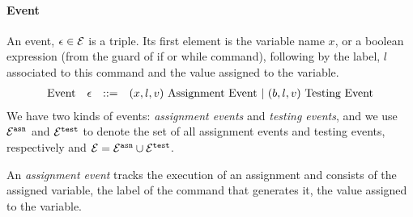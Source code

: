 

\paragraph{Event}
An event, $\mathtt{\epsilon} \in \mathcal{E}$ is a triple.
Its first element is the variable name $x$,
or a boolean expression (from the guard of if or while command), 
following by 
 the label, $l$ associated to this command and the value assigned to the variable.
 \[
  \begin{array}{llll}
    \mbox{Event} 
    & \mathtt{\epsilon} & ::= & 
    ({x}, l, v) ~ \mbox{Assignment Event} 
    ~|~(b, l, v) ~ \mbox{Testing Event}
  \end{array}
  \]  
 We have two kinds of events: \emph{assignment events} and \emph{testing events},
 and we use $\mathcal{E}^{\mathtt{{asn}}}$ and $\mathcal{E}^{\mathtt{{test}}}$ to denote the set of all assignment events and testing events, respectively and $\mathcal{E} = \mathcal{E}^{\mathtt{{asn}}} \cup \mathcal{E}^{\mathtt{{test}}}$.
 
 An \emph{assignment event} tracks the execution of an assignment and consists of the assigned variable, the label of the command that generates it, the value assigned to the variable.

